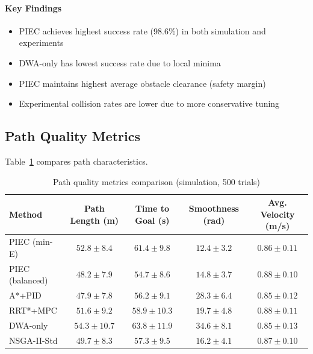 
\paragraph{Key Findings}
\begin{itemize}
    \item PIEC achieves highest success rate (98.6\%) in both simulation and experiments
    \item DWA-only has lowest success rate due to local minima
    \item PIEC maintains highest average obstacle clearance (safety margin)
    \item Experimental collision rates are lower due to more conservative tuning
\end{itemize}

\subsection{Path Quality Metrics}

Table~\ref{tab:comparison_path_quality} compares path characteristics.

\begin{table}[htbp]
\centering
\caption{Path quality metrics comparison (simulation, 500 trials)}
\label{tab:comparison_path_quality}
\begin{tabular}{lcccc}
\toprule
\textbf{Method} & \textbf{Path Length (m)} & \textbf{Time to Goal (s)} & \textbf{Smoothness (rad)} & \textbf{Avg. Velocity (m/s)} \\
\midrule
PIEC (min-E) & $52.8 \pm 8.4$ & $61.4 \pm 9.8$ & $\mathbf{12.4 \pm 3.2}$ & $0.86 \pm 0.11$ \\
PIEC (balanced) & $\mathbf{48.2 \pm 7.9}$ & $\mathbf{54.7 \pm 8.6}$ & $14.8 \pm 3.7$ & $\mathbf{0.88 \pm 0.10}$ \\
A*+PID & $47.9 \pm 7.8$ & $56.2 \pm 9.1$ & $28.3 \pm 6.4$ & $0.85 \pm 0.12$ \\
RRT*+MPC & $51.6 \pm 9.2$ & $58.9 \pm 10.3$ & $19.7 \pm 4.8$ & $0.88 \pm 0.11$ \\
DWA-only & $54.3 \pm 10.7$ & $63.8 \pm 11.9$ & $34.6 \pm 8.1$ & $0.85 \pm 0.13$ \\
NSGA-II-Std & $49.7 \pm 8.3$ & $57.3 \pm 9.5$ & $16.2 \pm 4.1$ & $0.87 \pm 0.10$ \\
\bottomrule
\end{tabular}
\end{table}

